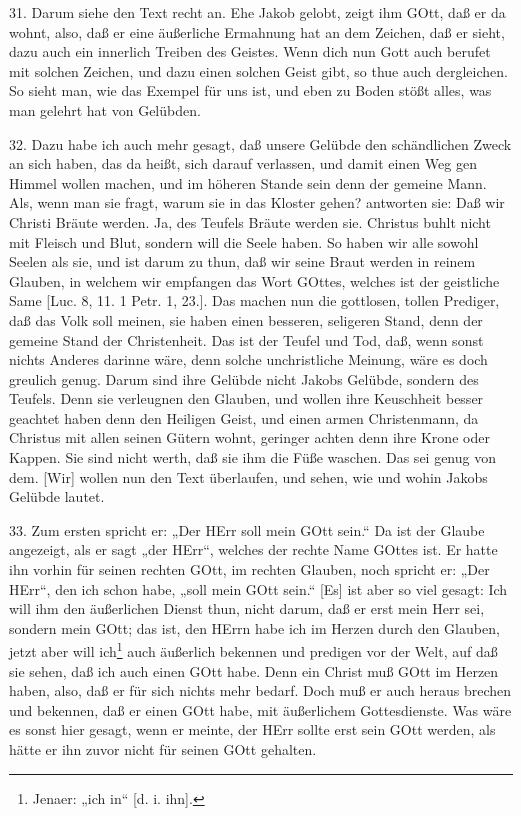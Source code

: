 31. Darum siehe den Text recht an. Ehe Jakob gelobt, zeigt ihm GOtt, daß er da wohnt, also, daß er eine äußerliche Ermahnung hat an dem Zeichen, daß er sieht, dazu auch ein innerlich Treiben des Geistes. Wenn dich nun Gott auch berufet mit solchen Zeichen, und dazu einen solchen Geist gibt, so thue auch dergleichen. So sieht man, wie das Exempel für uns ist, und eben zu Boden stößt alles, was man gelehrt hat von Gelübden.

32. Dazu habe ich auch mehr gesagt, daß unsere Gelübde den schändlichen Zweck an sich haben, das da heißt, sich darauf verlassen, und damit einen Weg gen Himmel wollen machen, und im höheren Stande sein denn der gemeine Mann. Als, wenn man sie fragt, warum sie in das Kloster gehen? antworten sie: Daß wir Christi Bräute werden. Ja, des Teufels Bräute werden sie. Christus buhlt nicht mit Fleisch und Blut, sondern will die Seele haben. So haben wir alle sowohl Seelen als sie, und ist darum zu thun, daß wir seine Braut werden in reinem Glauben, in welchem wir empfangen das Wort GOttes, welches ist der geistliche Same [Luc. 8, 11. 1 Petr. 1, 23.]. Das machen nun die gottlosen, tollen Prediger, daß das Volk soll meinen, sie haben einen besseren, seligeren Stand, denn der gemeine Stand der Christenheit. Das ist der Teufel und Tod, daß, wenn sonst nichts Anderes darinne wäre, denn solche unchristliche Meinung, wäre es doch greulich genug. Darum sind ihre Gelübde nicht Jakobs Gelübde, sondern des Teufels. Denn sie verleugnen den Glauben, und wollen ihre Keuschheit besser geachtet haben denn den Heiligen Geist, und einen armen Christenmann, da Christus mit allen seinen Gütern wohnt, geringer achten denn ihre Krone oder Kappen. Sie sind nicht werth, daß sie ihm die Füße waschen. Das sei genug von dem. [Wir] wollen nun den Text überlaufen, und sehen, wie und wohin Jakobs Gelübde lautet.

33. Zum ersten spricht er: „Der HErr soll mein GOtt sein.“ Da ist der Glaube angezeigt, als er sagt „der HErr“, welches der rechte Name GOttes ist. Er hatte ihn vorhin für seinen rechten GOtt, im rechten Glauben, noch spricht er: „Der HErr“, den ich schon habe, „soll mein GOtt sein.“ [Es] ist aber so viel gesagt: Ich will ihm den äußerlichen Dienst thun, nicht darum, daß er erst mein Herr sei, sondern mein GOtt; das ist, den HErrn habe ich im Herzen durch den Glauben, jetzt aber will ich\footnote{Jenaer: „ich in“ [d. i. ihn].} auch äußerlich bekennen und predigen vor der Welt, auf daß sie sehen, daß ich auch einen GOtt habe. Denn ein Christ muß GOtt im Herzen haben, also, daß er für sich nichts mehr bedarf. Doch muß er auch heraus brechen und bekennen, daß er einen GOtt habe, mit äußerlichem Gottesdienste. Was wäre es sonst hier gesagt, wenn er meinte, der HErr sollte erst sein GOtt werden, als hätte er ihn zuvor nicht für seinen GOtt gehalten.

